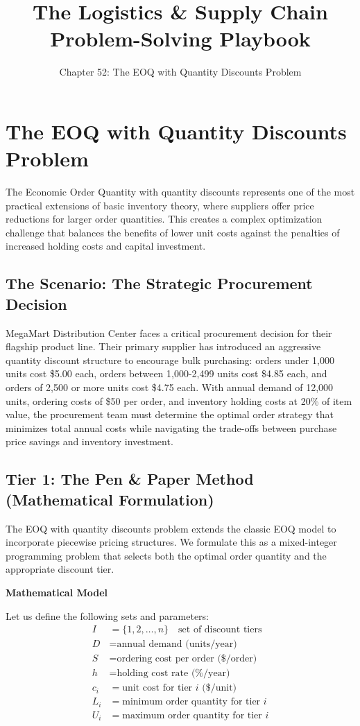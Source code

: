 \documentclass{article}
\title{The Logistics \& Supply Chain Problem-Solving Playbook}
\author{Chapter 52: The EOQ with Quantity Discounts Problem}
\date{}
\begin{document}
\maketitle

\section{The EOQ with Quantity Discounts Problem}

The Economic Order Quantity with quantity discounts represents one of the most practical extensions of basic inventory theory, where suppliers offer price reductions for larger order quantities. This creates a complex optimization challenge that balances the benefits of lower unit costs against the penalties of increased holding costs and capital investment.

\subsection{The Scenario: The Strategic Procurement Decision}

MegaMart Distribution Center faces a critical procurement decision for their flagship product line. Their primary supplier has introduced an aggressive quantity discount structure to encourage bulk purchasing: orders under 1,000 units cost \$5.00 each, orders between 1,000-2,499 units cost \$4.85 each, and orders of 2,500 or more units cost \$4.75 each. With annual demand of 12,000 units, ordering costs of \$50 per order, and inventory holding costs at 20\% of item value, the procurement team must determine the optimal order strategy that minimizes total annual costs while navigating the trade-offs between purchase price savings and inventory investment.

\subsection{Tier 1: The Pen \& Paper Method (Mathematical Formulation)}

The EOQ with quantity discounts problem extends the classic EOQ model to incorporate piecewise pricing structures. We formulate this as a mixed-integer programming problem that selects both the optimal order quantity and the appropriate discount tier.

\textbf{Mathematical Model}

Let us define the following sets and parameters:
\begin{align}
I &= \{1, 2, \ldots, n\} \quad \text{set of discount tiers} \\
D &= \text{annual demand (units/year)} \\
S &= \text{ordering cost per order (\$/order)} \\
h &= \text{holding cost rate (\%/year)} \\
c_i &= \text{unit cost for tier } i \text{ (\$/unit)} \\
L_i &= \text{minimum order quantity for tier } i \\
U_i &= \text{maximum order quantity for tier } i
\end{align}
\end{document}
